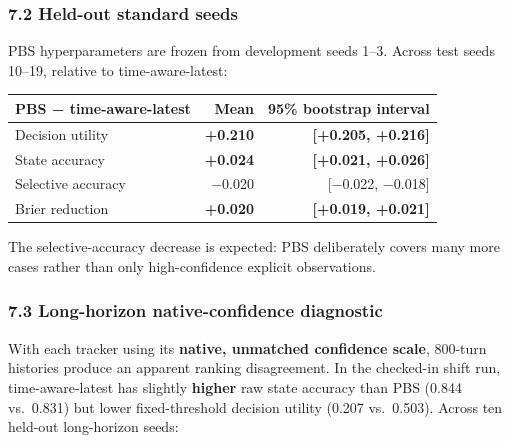 \subsubsection{7.2 Held-out standard
seeds}\label{held-out-standard-seeds}

PBS hyperparameters are frozen from development seeds 1--3. Across test
seeds 10--19, relative to time-aware-latest:

\begin{longtable}[]{@{}lrr@{}}
\toprule\noalign{}
PBS − time-aware-latest & Mean & 95\% bootstrap interval \\
\midrule\noalign{}
\endhead
\bottomrule\noalign{}
\endlastfoot
Decision utility & \textbf{+0.210} & \textbf{{[}+0.205, +0.216{]}} \\
State accuracy & \textbf{+0.024} & \textbf{{[}+0.021, +0.026{]}} \\
Selective accuracy & −0.020 & {[}−0.022, −0.018{]} \\
Brier reduction & \textbf{+0.020} & \textbf{{[}+0.019, +0.021{]}} \\
\end{longtable}

The selective-accuracy decrease is expected: PBS deliberately covers
many more cases rather than only high-confidence explicit observations.

\subsubsection{7.3 Long-horizon native-confidence
diagnostic}\label{long-horizon-native-confidence-diagnostic}

With each tracker using its \textbf{native, unmatched confidence scale},
800-turn histories produce an apparent ranking disagreement. In the
checked-in shift run, time-aware-latest has slightly \textbf{higher} raw
state accuracy than PBS (0.844 vs.~0.831) but lower fixed-threshold
decision utility (0.207 vs.~0.503). Across ten held-out long-horizon
seeds:


